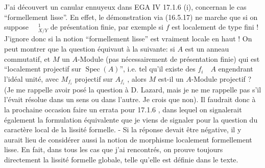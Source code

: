 
J'ai découvert un canular ennuyeux dans EGA IV 17.1.6 (i), concernan le cas ``formellement lisse''. En effet, le démonstration via (16.5.17) ne marche que si on suppose $\quad{}^1_{X/Y}$ de présentation finie, par exemple si $f$ est localement de  type fini ! J'ignore donc si la notion ``formellement lisse'' est vraiment locale en haut ! On peut montrer que la question équivaut à la suivante: si $A$ est un anneau commutatif, et $M$ un $A$-Module (pas nécessairement de présentation finie) qui est ``localement projectif sur $\operatorname{Spec}(A)$'', i.e. tel qu'il existe des $f_i\quad A$ engendrant l'idéal unité, avec $M_{f_i}$ projectif sur $A_{f_i}$ , alors $M$ est-il un $A$-Module projectif ? (Je me rappelle avoir posé la question à D. Lazard, mais je ne me rappelle pas s'il l'évait résolue dans un sens ou dans l'autre. Je crois que non). Il faudrait donc à la prochaine occasion faire un errata pour 17.1.6 , dans lequel on  signalerait également la formulation équivalente que je viens de signaler pour la question du caractère local de la lissité formelle. - Si la réponse devait être négative, il y aurait lieu de considérer aussi la notion de morphisme localement formellement lisse. En fait, dans tous les cas que j'ai rencontrés,  on prouve toujours directement la lissité formelle globale, telle qu'elle est définie dans le texte.


